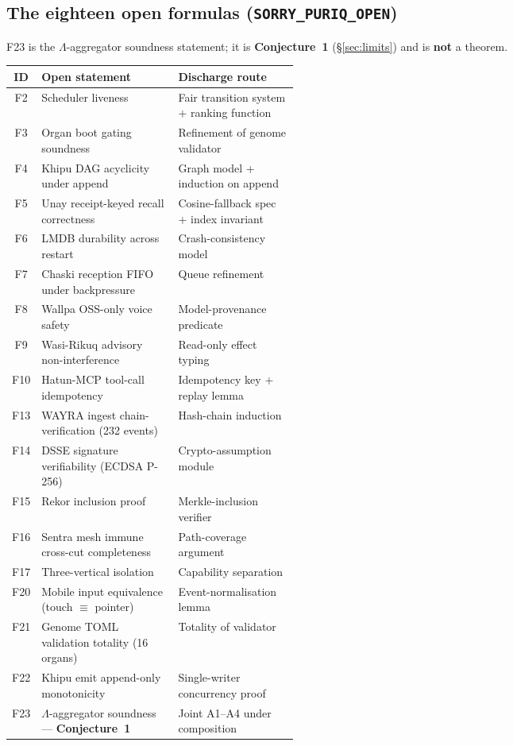 \documentclass[11pt]{article}
\theoremstyle{plain}
\theoremstyle{definition}
\theoremstyle{remark}
\newcommand{\La}{\Lambda}
\begin{document}
\subsection{The eighteen open formulas (\texttt{SORRY\_PURIQ\_OPEN})}
F23 is the $\La$-aggregator soundness statement; it is \textbf{Conjecture~1}
(\S\ref{sec:limits}) and is \textbf{not} a theorem.
\begin{center}
\begin{longtable}{@{}clp{0.42\linewidth}@{}}
\toprule
\textbf{ID} & \textbf{Open statement} & \textbf{Discharge route}\\
\midrule
\endhead
F2 & Scheduler liveness & Fair transition system + ranking function\\
F3 & Organ boot gating soundness & Refinement of genome validator\\
F4 & Khipu DAG acyclicity under append & Graph model + induction on append\\
F5 & Unay receipt-keyed recall correctness & Cosine-fallback spec + index invariant\\
F6 & LMDB durability across restart & Crash-consistency model\\
F7 & Chaski reception FIFO under backpressure & Queue refinement\\
F8 & Wallpa OSS-only voice safety & Model-provenance predicate\\
F9 & Wasi-Rikuq advisory non-interference & Read-only effect typing\\
F10 & Hatun-MCP tool-call idempotency & Idempotency key + replay lemma\\
F13 & WAYRA ingest chain-verification (232 events) & Hash-chain induction\\
F14 & DSSE signature verifiability (ECDSA P-256) & Crypto-assumption module\\
F15 & Rekor inclusion proof & Merkle-inclusion verifier\\
F16 & Sentra mesh immune cross-cut completeness & Path-coverage argument\\
F17 & Three-vertical isolation & Capability separation\\
F20 & Mobile input equivalence (touch $\equiv$ pointer) & Event-normalisation lemma\\
F21 & Genome TOML validation totality (16 organs) & Totality of validator\\
F22 & Khipu emit append-only monotonicity & Single-writer concurrency proof\\
F23 & $\La$-aggregator soundness --- \textbf{Conjecture~1} & Joint A1--A4 under composition\\
\bottomrule
\end{longtable}
\end{center}
\end{document}
